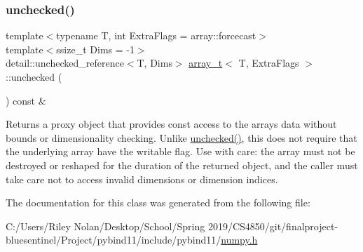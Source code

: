 \mbox{\label{classarray__t_a97bf54c6d71ac61d4a8a311d49fc3dff}} 
\subsubsection{\texorpdfstring{unchecked()}{unchecked()}}
{\footnotesize\ttfamily template$<$typename T, int Extra\+Flags = array\+::forcecast$>$ \\
template$<$ssize\+\_\+t Dims = -\/1$>$ \\
detail\+::unchecked\+\_\+reference$<$T, Dims$>$ \mbox{\hyperlink{classarray__t}{array\+\_\+t}}$<$ T, Extra\+Flags $>$\+::unchecked (\begin{DoxyParamCaption}{ }\end{DoxyParamCaption}) const \&\hspace{0.3cm}{\ttfamily [inline]}}

Returns a proxy object that provides const access to the array\textquotesingle{}s data without bounds or dimensionality checking. Unlike {\ttfamily \mbox{\hyperlink{classarray__t_a97bf54c6d71ac61d4a8a311d49fc3dff}{unchecked()}}}, this does not require that the underlying array have the {\ttfamily writable} flag. Use with care\+: the array must not be destroyed or reshaped for the duration of the returned object, and the caller must take care not to access invalid dimensions or dimension indices. 

The documentation for this class was generated from the following file\+:\begin{DoxyCompactItemize}
\item 
C\+:/\+Users/\+Riley Nolan/\+Desktop/\+School/\+Spring 2019/\+C\+S4850/git/finalproject-\/bluesentinel/\+Project/pybind11/include/pybind11/\mbox{\hyperlink{numpy_8h}{numpy.\+h}}\end{DoxyCompactItemize}
